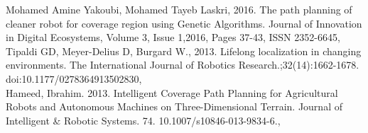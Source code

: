 \cleardoublepage
{}
{}
\begin{thebibliography}{99}

\texttt{}Mohamed Amine Yakoubi, Mohamed Tayeb Laskri, 2016. The path planning of cleaner robot for coverage region using Genetic Algorithms. Journal of Innovation in Digital Ecosystems, Volume 3, Issue 1,2016, Pages 37-43, ISSN 2352-6645\texttt{},\\ 

\texttt{}Tipaldi GD, Meyer-Delius D, Burgard W., 2013. Lifelong localization in changing environments. The International Journal of Robotics Research.;32(14):1662-1678. doi:10.1177/0278364913502830\texttt{},\\ 
\texttt{}Hameed, Ibrahim. 2013. Intelligent Coverage Path Planning for Agricultural Robots and Autonomous Machines on Three-Dimensional Terrain. Journal of Intelligent & Robotic Systems. 74. 10.1007/s10846-013-9834-6.\texttt{},\\ 
\end{thebibliography}
